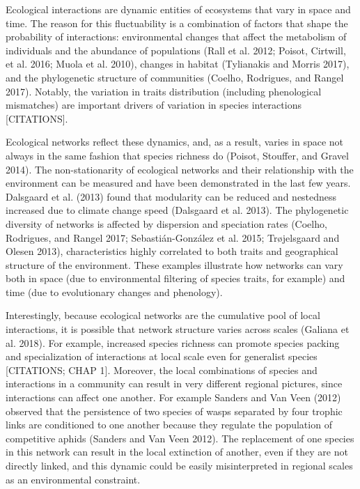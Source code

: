 \documentclass[12pt]{article}
\begin{document}
Ecological interactions are dynamic entities of ecosystems that vary in
space and time. The reason for this fluctuability is a combination of
factors that shape the probability of interactions: environmental
changes that affect the metabolism of individuals and the abundance of
populations (Rall et al. 2012; Poisot, Cirtwill, et al. 2016; Muola et
al. 2010), changes in habitat (Tylianakis and Morris 2017), and the
phylogenetic structure of communities (Coelho, Rodrigues, and Rangel
2017). Notably, the variation in traits distribution (including
phenological mismatches) are important drivers of variation in species
interactions {[}CITATIONS{]}.

Ecological networks reflect these dynamics, and, as a result, varies in
space not always in the same fashion that species richness do (Poisot,
Stouffer, and Gravel 2014). The non-stationarity of ecological networks
and their relationship with the environment can be measured and have
been demonstrated in the last few years. Dalsgaard et al. (2013) found
that modularity can be reduced and nestedness increased due to climate
change speed (Dalsgaard et al. 2013). The phylogenetic diversity of
networks is affected by dispersion and speciation rates (Coelho,
Rodrigues, and Rangel 2017; Sebastián-González et al. 2015; Trøjelsgaard
and Olesen 2013), characteristics highly correlated to both traits and
geographical structure of the environment. These examples illustrate how
networks can vary both in space (due to environmental filtering of
species traits, for example) and time (due to evolutionary changes and
phenology).

Interestingly, because ecological networks are the cumulative pool of
local interactions, it is possible that network structure varies across
scales (Galiana et al. 2018). For example, increased species richness
can promote species packing and specialization of interactions at local
scale even for generalist species {[}CITATIONS; CHAP 1{]}. Moreover, the
local combinations of species and interactions in a community can result
in very different regional pictures, since interactions can affect one
another. For example Sanders and Van Veen (2012) observed that the
persistence of two species of wasps separated by four trophic links are
conditioned to one another because they regulate the population of
competitive aphids (Sanders and Van Veen 2012). The replacement of one
species in this network can result in the local extinction of another,
even if they are not directly linked, and this dynamic could be easily
misinterpreted in regional scales as an environmental constraint.
\end{document}
